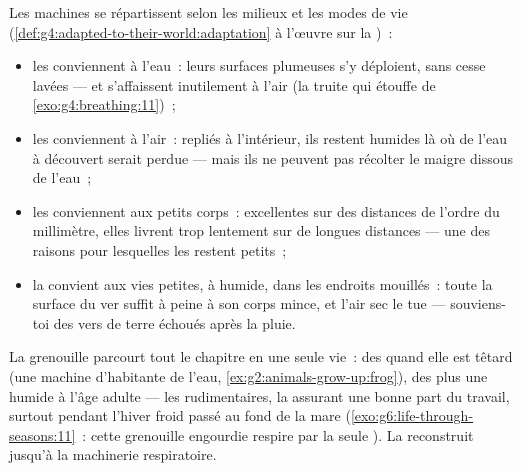 \begin{proposition}\label{prop:g7:how-animals-breathe:fits}
Les machines se répartissent selon les milieux et les modes de vie
(\cref{def:g4:adapted-to-their-world:adaptation} à l'œuvre sur la
)~:
\begin{itemize}
  \item les  conviennent à l'eau~: leurs surfaces
        plumeuses s'y déploient, sans cesse lavées --- et
        s'affaissent inutilement à l'air
        (la truite qui étouffe de \cref{exo:g4:breathing:11})~;
  \item les  conviennent à l'air~: repliés à l'intérieur,
        ils restent humides là où de l'eau à découvert serait
        perdue --- mais ils ne peuvent pas récolter le maigre
         dissous de l'eau~;
  \item les  conviennent aux petits corps~: excellentes sur
        des distances de l'ordre du millimètre, elles livrent trop
        lentement sur de longues distances --- une des raisons pour
        lesquelles les  restent petits~;
  \item la  convient aux vies petites, à 
        humide, dans les endroits mouillés~: toute la surface du
        ver suffit à peine à son corps mince, et l'air sec le tue
        --- souviens-toi des vers de terre échoués après la pluie.
\end{itemize}
\end{proposition}
\admitted

\begin{example}\label{ex:g7:how-animals-breathe:frog}
La grenouille parcourt tout le chapitre en une seule vie~: des
 quand elle est têtard (une machine d'habitante de l'eau,
\cref{ex:g2:animals-grow-up:frog}), des  plus une  humide
à l'âge adulte --- les  rudimentaires, la  assurant une
bonne part du travail, surtout pendant l'hiver froid passé au fond
de la mare (\cref{exo:g6:life-through-seasons:11}~: cette grenouille
engourdie respire par la seule ). La  reconstruit
jusqu'à la machinerie respiratoire.
\end{example}

